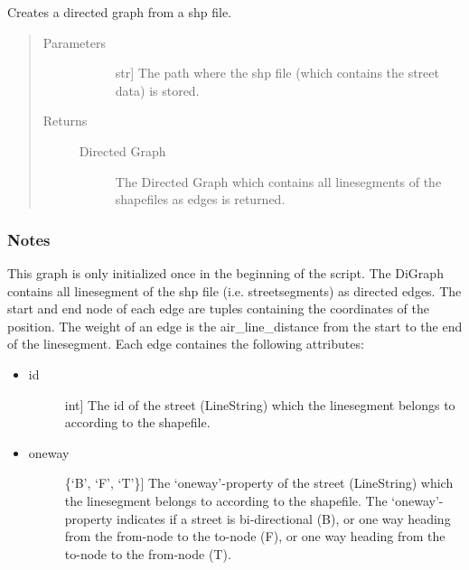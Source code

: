 \documentclass[letterpaper,10pt,english]{sphinxmanual}
\begin{document}
\begin{fulllineitems}
\label{\detokenize{index:gps2net.createGraphFromSHPInput}}
Creates a directed graph from a shp file.
\begin{quote}\begin{description}
\item[{Parameters}] \leavevmode\begin{description}
\item[{}] \leavevmode{[}str{]}
The path where the shp file (which contains the street data) is stored.

\end{description}

\item[{Returns}] \leavevmode\begin{description}
\item[{Directed Graph}] \leavevmode
The Directed Graph which contains all linesegments of the shapefiles as edges is returned.

\end{description}

\end{description}\end{quote}
\subsubsection*{Notes}

This graph is only initialized once in the beginning of the script. The DiGraph contains all linesegment of the shp file (i.e. streetsegments) as directed edges. The start and end node of each edge are tuples containing the coordinates of the position. The weight of an edge is the air\_line\_distance from the start to the end of the linesegment. Each edge containes the following attributes:
\begin{itemize}
\item {} \begin{description}
\item[{id}] \leavevmode{[}int{]}
The id of the street (LineString) which the linesegment belongs to according to the shapefile.

\end{description}

\item {} \begin{description}
\item[{oneway}] \leavevmode{[}\{‘B’, ‘F’, ‘T’\}{]}
The ‘oneway’-property of the street (LineString) which the linesegment belongs to according to the shapefile. The ‘oneway’-property indicates if a street is bi-directional (B), or one way heading from the from-node to the to-node (F), or one way heading from the to-node to the from-node (T).


\end{description}
\end{itemize}
\end{fulllineitems}
\end{document}
